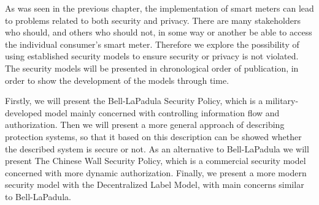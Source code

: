 
As was seen in the previous chapter, the implementation of smart meters can lead to problems related to both security and privacy.
There are many stakeholders who should, and others who should not, in some way or another be able to access the individual consumer's smart meter.
Therefore we explore the possibility of using established security models to ensure security or privacy is not violated.
The security models will be presented in chronological order of publication, in order to show the development of the models through time.

Firstly, we will present the Bell-LaPadula Security Policy, which is a military-developed model mainly concerned with controlling information flow and authorization.
Then we will present a more general approach of describing protection systems, so that it based on this description can be showed whether the described system is secure or not.
As an alternative to Bell-LaPadula we will present The Chinese Wall Security Policy, which is a commercial security model concerned with more dynamic authorization.
Finally, we present a more modern security model with the Decentralized Label Model, with main concerns similar to Bell-LaPadula.

